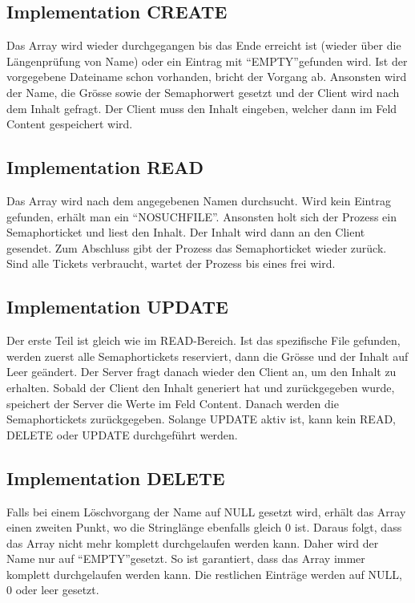\documentclass[12pt,a4paper,ngerman]{report}
\begin{document}
\subsection{Implementation CREATE}
Das Array wird wieder durchgegangen bis das Ende erreicht ist (wieder über die Längenprüfung von Name) oder ein Eintrag mit \textquotedblleft EMPTY\textquotedblright gefunden wird. Ist der vorgegebene Dateiname schon vorhanden, bricht der Vorgang ab. Ansonsten wird der Name, die Grösse sowie der Semaphorwert gesetzt und der Client wird nach dem Inhalt gefragt. Der Client muss den Inhalt eingeben, welcher dann im Feld Content gespeichert wird.
\subsection{Implementation READ}
Das Array wird nach dem angegebenen Namen durchsucht. Wird kein Eintrag gefunden, erhält man ein \textquotedblleft NOSUCHFILE\textquotedblright . Ansonsten holt sich der Prozess ein Semaphorticket und liest den Inhalt. Der Inhalt wird dann an den Client gesendet. Zum Abschluss gibt der Prozess das Semaphorticket wieder zurück. Sind alle Tickets verbraucht, wartet der Prozess bis eines frei wird.
\subsection{Implementation UPDATE}
Der erste Teil ist gleich wie im READ-Bereich. Ist das spezifische File gefunden, werden zuerst alle Semaphortickets reserviert, dann die Grösse und der Inhalt auf Leer geändert. Der Server fragt danach wieder den Client an, um den Inhalt zu erhalten. Sobald der Client den Inhalt generiert hat und zurückgegeben wurde, speichert der Server die Werte im Feld Content. Danach werden die Semaphortickets zurückgegeben. Solange UPDATE aktiv ist, kann kein READ, DELETE oder UPDATE durchgeführt werden.
\subsection{Implementation DELETE}
Falls bei einem Löschvorgang der Name auf NULL gesetzt wird, erhält das Array einen zweiten Punkt, wo die Stringlänge ebenfalls gleich 0 ist. Daraus folgt, dass das Array nicht mehr komplett durchgelaufen werden kann. Daher wird der Name nur auf \textquotedblleft EMPTY\textquotedblright gesetzt. So ist garantiert, dass das Array immer komplett durchgelaufen werden kann. Die restlichen Einträge werden auf NULL, 0 oder leer gesetzt.
\end{document}
